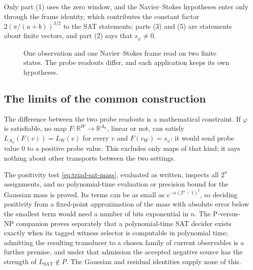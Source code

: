 Only part (1) uses the zero window, and the Navier--Stokes hypotheses
enter only through the frame identity, which contributes the constant
factor \(2(\pi/(a+b))^{3/2}\) to the SAT statements; parts (3) and (5)
are statements about finite vectors, and part (2) says that
\(s_{\varphi}\neq0\).

\begin{figure}[tbp]
\centering
{}
\caption{One observation and one Navier--Stokes frame read on two
finite states.  The probe readouts differ, and each application keeps
its own hypotheses.}
\label{fig:triad-observation-span}
\end{figure}

\subsection{The limits of the common construction}

The difference between the two probe readouts is a mathematical
constraint.  If \(\varphi\) is satisfiable, no map
\(F:\mathbb R^{W}\to\mathbb R^{A_{n}}\), linear or not, can satisfy
\(L_{A_{n}}(F(v))=L_{W}(v)\) for every \(v\) and \(F(v_{W})=s_{\varphi}\):
it would send probe value \(0\) to a positive probe value.  This
excludes only maps of that kind; it says nothing about other transports
between the two settings.

The positivity test \eqref{eq:triad-sat-mass}, evaluated as written,
inspects all \(2^{n}\) assignments, and no polynomial-time evaluation
or precision bound for the Gaussian mass is proved.  Its terms can be as
small as \(e^{-\kappa(2^{n}-1)^{2}}\), so deciding positivity from a
fixed-point approximation of the mass with absolute error below the
smallest term would need a number of bits exponential in \(n\).  The P-versus-NP companion proves separately that a
polynomial-time SAT decider exists exactly when its tagged witness
selector is computable in polynomial time; admitting the resulting
transducer to a chosen family of current observables is a further
premise, and under that admission the accepted negative source has the
strength of \(L_{\mathrm{SAT}}\notin P\).  The Gaussian and residual
identities supply none of this.

